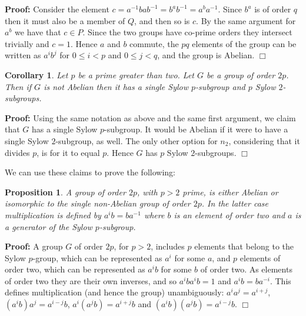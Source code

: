\documentclass[11pt]{article} \usepackage{amssymb}
\newtheorem{proposition}[theorem]{Proposition}
\newtheorem{corollary}[theorem]{Corollary}
\newenvironment{proof}{\noindent \textbf{Proof:}}{$\Box$}
\begin{document}
\begin{enumerate}
\begin{proof}
      Consider the element $c=a^{-1}bab^{-1}=b^ab^{-1}=a^ba^{-1}$. Since
      $b^a$ is of order $q$ then it must also be a member of $Q$, and then
      so is $c$. By the same argument for $a^b$ we have that $c \in P$. Since
      the two groups have co-prime orders they intersect trivially and $c=1$. 
      Hence $a$ and $b$ commute, the $pq$ elements of the group can be written 
      as $a^ib^j$ for $0\leq i <p$ and $0\leq j < q$, and the group is Abelian.
    \end{proof}
    \begin{corollary}
      \label{prop:2p_groups}
      Let $p$ be a prime greater than two. Let $G$ be a group of order
      $2p$. Then if $G$ is not Abelian then it has a single Sylow $p$-subgroup
      and $p$ Sylow $2$-subgroups.
    \end{corollary}
    \begin{proof}
      Using the same notation as above and the same first argument, we claim
      that $G$ has a single Sylow $p$-subgroup. It would be Abelian if it were 
      to have a single Sylow $2$-subgroup, as well. The only other option for
      $n_2$, considering that it divides $p$, is for it to equal $p$. Hence
      $G$ has $p$ Sylow $2$-subgroups.
    \end{proof}

    We can use these claims to prove the following:
    \begin{proposition}
      \label{prop:2p_unique}
      A group of order $2p$, with $p>2$ prime, is either Abelian or isomorphic 
      to the single non-Abelian
      group of order $2p$. In the latter case multiplication is defined by
      $a^ib=ba^{-1}$ where $b$ is an element of order two and $a$ is a generator
      of the Sylow $p$-subgroup.
    \end{proposition}
    \begin{proof}
      A group $G$ of order $2p$, for $p>2$, includes $p$ elements that 
      belong to the Sylow $p$-group,
      which can be represented as $a^i$ for some $a$, and $p$ elements of order
      two, which can be represented as $a^ib$ for some $b$ of order two. As
      elements of order two they are their own inverses, and so $a^iba^ib=1$ and
      $a^ib=ba^{-i}$. This defines multiplication (and hence the group) 
      unambiguously: $a^ia^j=a^{i+j}$,
      $(a^ib)a^j=a^{i-j}b$, $a^i(a^jb)=a^{i+j}b$ and $(a^ib)(a^jb)=a^{i-j}b$.
    \end{proof}


\end{enumerate}
\end{document}
